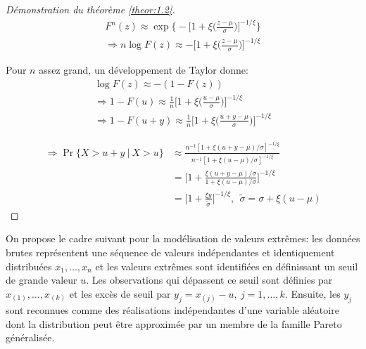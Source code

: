 \documentclass[11pt]{report}
\numberwithin{equation}{section}
\begin{document}
\begin{proof}[Démonstration du théorème \ref{theor:1.2}]

\begin{equation*}
\begin{split}
F^n(z) \approx \exp \Bigg\{ - \Big[ 1 +\xi\Big(\frac{z-\mu}{\sigma}\Big) \Big]^{-1/\xi}  \Bigg\}\\
\Rightarrow n\log F(z) \approx - \Big[ 1 +\xi\Big(\frac{z-\mu}{\sigma}\Big) \Big]^{-1/\xi} 
\end{split}
\end{equation*}

Pour $n$ assez grand, un développement de Taylor donne:
\begin{equation*}
\begin{split}
\log F(z) \approx -(1-F(z))\\
\Rightarrow 1-F(u) \approx \frac{1}{n} \Big[ 1 +\xi\Big(\frac{u-\mu}{\sigma}\Big) \Big]^{-1/\xi}\\
\Rightarrow 1-F(u+y) \approx \frac{1}{n} \Big[ 1 +\xi\Big(\frac{u+y-\mu}{\sigma}\Big) \Big]^{-1/\xi}
\end{split}
\end{equation*}

\begin{equation*}
\begin{split}
\Rightarrow \Pr{\{ X>u+y\ |\ X>u \}} &\approx \frac{n^{-1}[1 + \xi(u+y-\mu)/\sigma]^{-1/\xi}}{n^{-1}[1 + \xi(u-\mu)/\sigma]^{-1/\xi}} \\
    &= \Bigg[ 1 + \frac{\xi(u+y-\mu)/\sigma}{1 + \xi(u-\mu)/\sigma}\Bigg]^{-1/\xi} \\
    &= \Bigg[1 + \frac{\xi y}{\tilde\sigma} \Bigg]^{-1/\xi},\ \ \tilde{\sigma} = \sigma + \xi(u - \mu)
\end{split}
\end{equation*}

\end{proof}


On propose le cadre suivant pour la modélisation de valeurs extrêmes: les données brutes représentent une séquence de valeurs indépendantes et identiquement distribuées $x_1,\dots,x_n$ et les valeurs extrêmes sont identifiées en définissant un seuil de grande valeur $u$. Les observations qui dépassent ce seuil sont définies par $x_{(1)},\dots,x_{(k)}$ et les excès de seuil par $y_j = x_{(j)} - u,\ j=1,\dots,k$. Ensuite, les $y_j$ sont reconnues comme des réalisations indépendantes d'une variable aléatoire dont la distribution peut être approximée par un membre de la famille Pareto généralisée.\\
\end{document}
